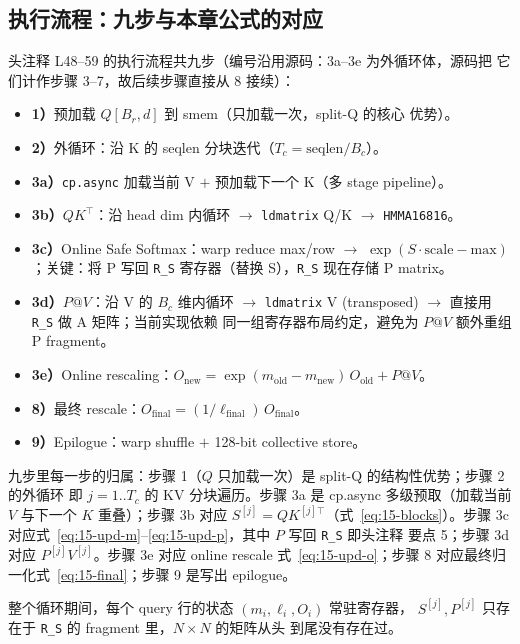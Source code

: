 \subsection{执行流程：九步与本章公式的对应}

头注释 L48--59 的执行流程共九步（编号沿用源码：3a--3e 为外循环体，源码把
它们计作步骤 3--7，故后续步骤直接从 8 接续）：
\begin{itemize}
  \item \textbf{1）}预加载 $Q[B_r, d]$ 到 smem（只加载一次，split-Q 的核心
        优势）。
  \item \textbf{2）}外循环：沿 K 的 seqlen 分块迭代（$T_c =
        \mathrm{seqlen}/B_c$）。
  \item \textbf{3a）}\texttt{cp.async} 加载当前 V $+$ 预加载下一个 K（多
        stage pipeline）。
  \item \textbf{3b）}$QK^{\top}$：沿 head dim 内循环 $\to$ \texttt{ldmatrix}
        Q/K $\to$ \texttt{HMMA16816}。
  \item \textbf{3c）}Online Safe Softmax：warp reduce max/row $\to$
        $\exp(S \cdot \mathrm{scale} - \mathrm{max})$；关键：将 P 写回
        \texttt{R\_S} 寄存器（替换 S），\texttt{R\_S} 现在存储 P matrix。
  \item \textbf{3d）}$P@V$：沿 V 的 $B_c$ 维内循环 $\to$ \texttt{ldmatrix}
        V (transposed) $\to$ 直接用 \texttt{R\_S} 做 A 矩阵；当前实现依赖
        同一组寄存器布局约定，避免为 $P@V$ 额外重组 P fragment。
  \item \textbf{3e）}Online rescaling：$O_{\text{new}} =
        \exp(m_{\text{old}} - m_{\text{new}})\,O_{\text{old}} + P@V$。
  \item \textbf{8）}最终 rescale：$O_{\text{final}} =
        (1/\ell_{\text{final}})\,O_{\text{final}}$。
  \item \textbf{9）}Epilogue：warp shuffle $+$ 128-bit collective store。
\end{itemize}

九步里每一步的归属：步骤 1（$Q$ 只加载一次）是 split-Q 的结构性优势；步骤 2 的外循环
即 $j = 1..T_c$ 的 KV 分块遍历。步骤 3a 是 cp.async 多级预取（加载当前 $V$ 与下一个
$K$ 重叠）；步骤 3b 对应 $S^{[j]} = QK^{[j]\top}$（式~\ref{eq:15-blocks}）。步骤 3c
对应式~\ref{eq:15-upd-m}--\ref{eq:15-upd-p}，其中 $P$ 写回 \texttt{R\_S} 即头注释
要点 5；步骤 3d 对应 $P^{[j]}V^{[j]}$。步骤 3e 对应 online rescale
式~\ref{eq:15-upd-o}；步骤 8 对应最终归一化式~\ref{eq:15-final}；步骤 9 是写出
epilogue。

整个循环期间，每个 query 行的状态 $(m_i, \ell_i, O_i)$ 常驻寄存器，
$S^{[j]}, P^{[j]}$ 只存在于 \texttt{R\_S} 的 fragment 里，$N \times N$ 的矩阵从头
到尾没有存在过。

